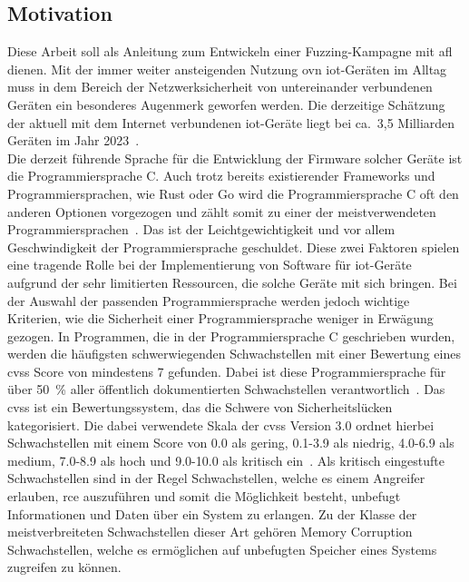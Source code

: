 
\subsection{Motivation}\label{subsec:motivation}
Diese Arbeit soll als Anleitung zum Entwickeln einer Fuzzing-Kampagne mit \gls{afl} dienen.
Mit der immer weiter ansteigenden Nutzung ovn \gls{iot}-Geräten im Alltag muss in dem Bereich der Netzwerksicherheit
von untereinander verbundenen Geräten ein besonderes Augenmerk geworfen werden.
Die derzeitige Schätzung der aktuell mit dem Internet verbundenen \gls{iot}-Geräte liegt bei ca.\ 3,5 Milliarden Geräten
im Jahr 2023~\cite{iot-statistik}. \\
Die derzeit führende Sprache für die Entwicklung der Firmware solcher Geräte ist die Programmiersprache C\@.
Auch trotz bereits existierender Frameworks und Programmiersprachen, wie Rust oder Go wird die Programmiersprache
C oft den anderen Optionen vorgezogen und zählt somit zu einer der meistverwendeten Programmiersprachen~\cite{tiobe-programming-trends}.
Das ist der Leichtgewichtigkeit und vor allem Geschwindigkeit der Programmiersprache geschuldet.
Diese zwei Faktoren spielen eine tragende Rolle bei der Implementierung von Software für \gls{iot}-Geräte aufgrund
der sehr limitierten Ressourcen, die solche Geräte mit sich bringen.
Bei der Auswahl der passenden Programmiersprache werden jedoch wichtige Kriterien, wie die Sicherheit einer Programmiersprache
weniger in Erwägung gezogen.
In Programmen, die in der Programmiersprache C geschrieben wurden, werden die häufigsten schwerwiegenden Schwachstellen
mit einer Bewertung eines \gls{cvss} Score von mindestens 7 gefunden.
Dabei ist diese Programmiersprache für über \SI{50}{\percent} aller öffentlich dokumentierten Schwachstellen verantwortlich~\cite{most-secure-programming}.
Das \gls{cvss} ist ein Bewertungssystem, das die Schwere von Sicherheitslücken kategorisiert.
Die dabei verwendete Skala der \gls{cvss} Version 3.0 ordnet hierbei Schwachstellen mit einem Score von 0.0 als
gering, 0.1-3.9 als niedrig, 4.0-6.9 als medium, 7.0-8.9 als hoch und 9.0-10.0 als kritisch ein~\cite{cvss}.
Als kritisch eingestufte Schwachstellen sind in der Regel Schwachstellen, welche es einem Angreifer erlauben, \gls{rce}
auszuführen und somit die Möglichkeit besteht, unbefugt Informationen und Daten über ein System zu erlangen.
Zu der Klasse der meistverbreiteten Schwachstellen dieser Art gehören Memory Corruption Schwachstellen, welche es ermöglichen
auf unbefugten Speicher eines Systems zugreifen zu können.
